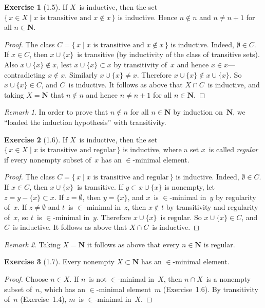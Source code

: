 \documentclass[letterpaper,12pt]{article}
\newcommand{\N}{\boldsymbol{N}}
\newcommand{\union}{\cup}
\newcommand{\sect}{\cap}
\newcommand{\suc}[1]{#1\union\{#1\}}
\theoremstyle{definition}
\newtheorem*{exer}{Exercise}
\theoremstyle{remark}
\newtheorem*{rmk}{Remark}
\begin{document}
\begin{exer}[1.5]
If \(X\)~is inductive, then the set \(\{\,x\in X\mid x\text{ is transitive and }x\not\in x\,\}\) is inductive. Hence \(n\not\in n\) and \(n\ne n+1\) for all \(n\in\N\).
\end{exer}
\begin{proof}
The class \(C=\{\,x\mid x\text{ is transitive and }x\not\in x\,\}\) is inductive. Indeed, \(\emptyset\in C\). If \(x\in C\), then \(\suc{x}\)~is transitive (by inductivity of the class of transitive sets). Also \(\suc{x}\not\in x\), lest \(\suc{x}\subset x\) by transitivity of~\(x\) and hence \(x\in x\)---contradicting \(x\not\in x\). Similarly \(\suc{x}\not=x\). Therefore \(\suc{x}\not\in\suc{x}\). So \(\suc{x}\in C\), and \(C\)~is inductive. It follows as above that \(X\sect C\)~is inductive, and taking \(X=\N\) that \(n\not\in n\) and hence \(n\ne n+1\) for all \(n\in\N\).
\end{proof}

\begin{rmk}
In order to prove that \(n\not\in n\) for all \(n\in\N\) by induction on~\(\N\), we ``loaded the induction hypothesis'' with transitivity.
\end{rmk}

\begin{exer}[1.6]
If \(X\)~is inductive, then the set \(\{\,x\in X\mid x\text{ is transitive and regular}\,\}\) is inductive, where a set \(x\)~is called \emph{regular} if every nonempty subset of~\(x\) has an \(\in\)-minimal element.
\end{exer}
\begin{proof}
The class \(C=\{\,x\mid x\text{ is transitive and regular}\,\}\) is inductive. Indeed, \(\emptyset\in C\). If \(x\in C\), then \(\suc{x}\)~is transitive. If \(y\subset\suc{x}\) is nonempty, let \(z=y-\{x\}\subset x\). If \(z=\emptyset\), then \(y=\{x\}\), and \(x\)~is \(\in\)-minimal in~\(y\) by regularity of~\(x\). If \(z\ne\emptyset\) and \(t\)~is \(\in\)-minimal in~\(z\), then \(x\not\in t\) by transitivity and regularity of~\(x\), so \(t\)~is \(\in\)-minimal in~\(y\). Therefore \(\suc{x}\)~is regular. So \(\suc{x}\in C\), and \(C\)~is inductive. It follows as above that \(X\sect C\)~is inductive.
\end{proof}

\begin{rmk}
Taking \(X=\N\) it follows as above that every \(n\in\N\) is regular.
\end{rmk}

\begin{exer}[1.7]
Every nonempty \(X\subset\N\) has an \(\in\)-minimal element.
\end{exer}
\begin{proof}
Choose \(n\in X\). If \(n\)~is not \(\in\)-minimal in~\(X\), then \(n\sect X\)~is a nonempty subset of~\(n\), which has an \(\in\)-minimal element~\(m\) (Exercise~1.6). By transitivity of~\(n\) (Exercise~1.4), \(m\)~is \(\in\)-minimal in~\(X\).
\end{proof}
\end{document}
